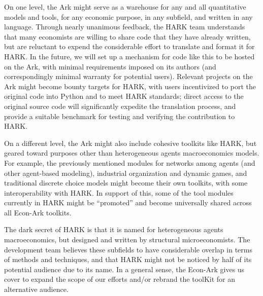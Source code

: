 \documentclass[12pt,titlepage,letterpaper]{econtex}
\begin{document}
{On one level, the Ark might serve as a warehouse for any and all quantitative models and tools, for any economic purpose, in any subfield, and written in any language.  Through nearly unanimous feedback, the HARK team understands that many economists are willing to share code that they have already written, but are reluctant to expend the considerable effort to translate and format it for HARK.  In the future, we will set up a mechanism for code like this to be hosted on the Ark, with minimal requirements imposed on its authors (and correspondingly minimal warranty for potential users).  Relevant projects on the Ark might become bounty targets for HARK, with users incentivized to port the original code into Python and to meet HARK standards; direct access to the original source code will significantly expedite the translation process, and provide a suitable benchmark for testing and verifying the contribution to HARK.

On a different level, the Ark might also include cohesive toolkits like HARK, but geared toward purposes other than heterogeneous agents macroeconomics models.  For example, the previously mentioned modules for networks among agents (and other agent-based modeling), industrial organization and dynamic games, and traditional discrete choice models might become their own toolkits, with some interoperability with HARK.  In support of this, some of the tool modules currently in HARK might be ``promoted'' and become universally shared across all Econ-Ark toolkits.

The dark secret of HARK is that it is named for heterogeneous agents macroeconomics, but designed and written by structural microeconomists.  The development team believes these subfields to have considerable overlap in terms of methods and techniques, and that HARK might not be noticed by half of its potential audience due to its name.  In a general sense, the Econ-Ark gives us cover to expand the scope of our efforts and/or rebrand the toolKit for an alternative audience.
} %
\end{document}
